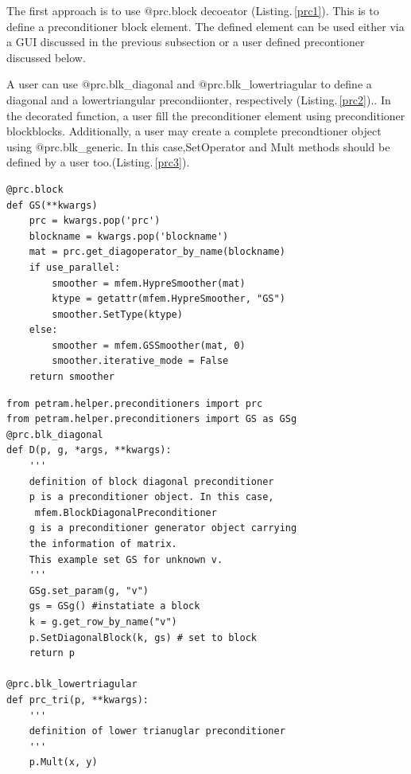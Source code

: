 \documentclass[11pt,a4paper,final]{report}
\begin{document}
The first approach is to use $@$prc.block decoeator (Listing.\,\ref{prc1}). This is to define a preconditioner block element.  The defined element can be used either via a GUI discussed in the previous subsection or a user defined precontioner discussed below.  


A user can use $@$prc.blk\_diagonal and $@$prc.blk\_lowertriagular to define a diagonal and a lowertriangular precondiionter, respectively (Listing.\,\ref{prc2}).. In the decorated function, a user fill the preconditioner element using preconditioner blockblocks. Additionally, a user may create a complete precondtioner object using $@$prc.blk\_generic. In this case,SetOperator and Mult methods should be defined  by a user too.(Listing.\,\ref{prc3}). 

\begin{minipage}[c]{0.95\textwidth}
\begin{lstlisting}[caption={A user defined preconditioner block},captionpos=b, frame=single, label={prc1}]
@prc.block
def GS(**kwargs)
    prc = kwargs.pop('prc')
    blockname = kwargs.pop('blockname')
    mat = prc.get_diagoperator_by_name(blockname)
    if use_parallel:
        smoother = mfem.HypreSmoother(mat)
        ktype = getattr(mfem.HypreSmoother, "GS")
        smoother.SetType(ktype)
    else:
        smoother = mfem.GSSmoother(mat, 0)
        smoother.iterative_mode = False
    return smoother
\end{lstlisting}
\end{minipage}

\begin{minipage}[c]{0.95\textwidth}
\begin{lstlisting}[frame=single, caption={A user defined diag/lowertriangular preconditioner},captionpos=b, label={prc2}]
from petram.helper.preconditioners import prc
from petram.helper.preconditioners import GS as GSg
@prc.blk_diagonal
def D(p, g, *args, **kwargs):
    '''
    definition of block diagonal preconditioner
    p is a preconditioner object. In this case,
     mfem.BlockDiagonalPreconditioner
    g is a preconditioner generator object carrying 
    the information of matrix.
    This example set GS for unknown v.  
    '''
    GSg.set_param(g, "v")
    gs = GSg() #instatiate a block
    k = g.get_row_by_name("v")
    p.SetDiagonalBlock(k, gs) # set to block
    return p
    
@prc.blk_lowertriagular
def prc_tri(p, **kwargs):
    '''
    definition of lower trianuglar preconditioner
    '''
    p.Mult(x, y)
\end{lstlisting}
\end{minipage}
\end{document}
